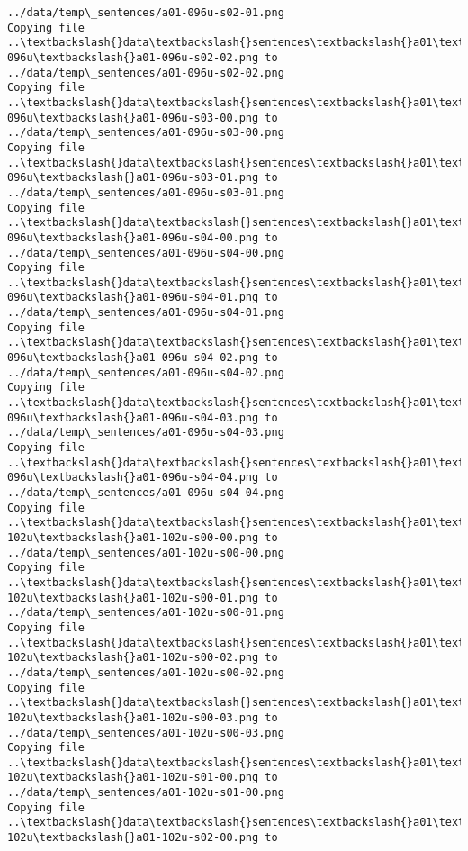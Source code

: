 \documentclass[11pt]{article}
\begin{document}
\begin{Verbatim}[commandchars=\\\{\}]
../data/temp\_sentences/a01-096u-s02-01.png
Copying file ..\textbackslash{}data\textbackslash{}sentences\textbackslash{}a01\textbackslash{}a01-096u\textbackslash{}a01-096u-s02-02.png to
../data/temp\_sentences/a01-096u-s02-02.png
Copying file ..\textbackslash{}data\textbackslash{}sentences\textbackslash{}a01\textbackslash{}a01-096u\textbackslash{}a01-096u-s03-00.png to
../data/temp\_sentences/a01-096u-s03-00.png
Copying file ..\textbackslash{}data\textbackslash{}sentences\textbackslash{}a01\textbackslash{}a01-096u\textbackslash{}a01-096u-s03-01.png to
../data/temp\_sentences/a01-096u-s03-01.png
Copying file ..\textbackslash{}data\textbackslash{}sentences\textbackslash{}a01\textbackslash{}a01-096u\textbackslash{}a01-096u-s04-00.png to
../data/temp\_sentences/a01-096u-s04-00.png
Copying file ..\textbackslash{}data\textbackslash{}sentences\textbackslash{}a01\textbackslash{}a01-096u\textbackslash{}a01-096u-s04-01.png to
../data/temp\_sentences/a01-096u-s04-01.png
Copying file ..\textbackslash{}data\textbackslash{}sentences\textbackslash{}a01\textbackslash{}a01-096u\textbackslash{}a01-096u-s04-02.png to
../data/temp\_sentences/a01-096u-s04-02.png
Copying file ..\textbackslash{}data\textbackslash{}sentences\textbackslash{}a01\textbackslash{}a01-096u\textbackslash{}a01-096u-s04-03.png to
../data/temp\_sentences/a01-096u-s04-03.png
Copying file ..\textbackslash{}data\textbackslash{}sentences\textbackslash{}a01\textbackslash{}a01-096u\textbackslash{}a01-096u-s04-04.png to
../data/temp\_sentences/a01-096u-s04-04.png
Copying file ..\textbackslash{}data\textbackslash{}sentences\textbackslash{}a01\textbackslash{}a01-102u\textbackslash{}a01-102u-s00-00.png to
../data/temp\_sentences/a01-102u-s00-00.png
Copying file ..\textbackslash{}data\textbackslash{}sentences\textbackslash{}a01\textbackslash{}a01-102u\textbackslash{}a01-102u-s00-01.png to
../data/temp\_sentences/a01-102u-s00-01.png
Copying file ..\textbackslash{}data\textbackslash{}sentences\textbackslash{}a01\textbackslash{}a01-102u\textbackslash{}a01-102u-s00-02.png to
../data/temp\_sentences/a01-102u-s00-02.png
Copying file ..\textbackslash{}data\textbackslash{}sentences\textbackslash{}a01\textbackslash{}a01-102u\textbackslash{}a01-102u-s00-03.png to
../data/temp\_sentences/a01-102u-s00-03.png
Copying file ..\textbackslash{}data\textbackslash{}sentences\textbackslash{}a01\textbackslash{}a01-102u\textbackslash{}a01-102u-s01-00.png to
../data/temp\_sentences/a01-102u-s01-00.png
Copying file ..\textbackslash{}data\textbackslash{}sentences\textbackslash{}a01\textbackslash{}a01-102u\textbackslash{}a01-102u-s02-00.png to

\end{Verbatim}
\end{document}
